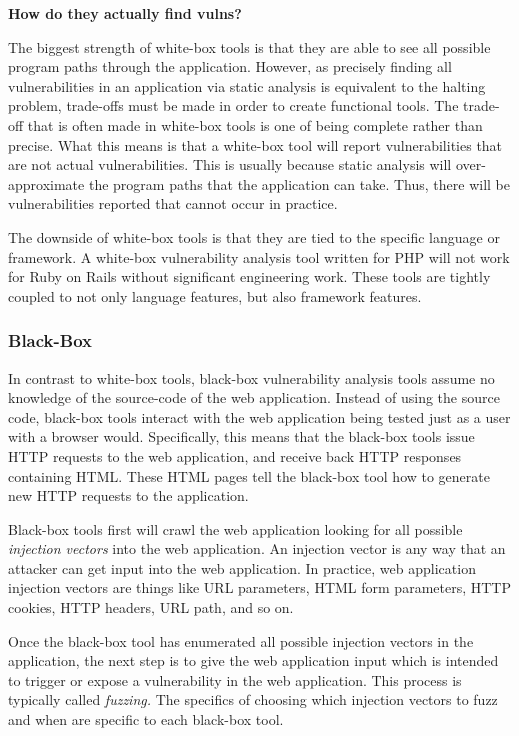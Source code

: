 \textbf{How do they actually find vulns?}

The biggest strength of white-box tools is that they are able to see
all possible program paths through the application. However, as
precisely finding all vulnerabilities in an application via static
analysis is equivalent to the halting problem, trade-offs must be made
in order to create functional tools. The trade-off that is often made
in white-box tools is one of being complete rather than precise. What
this means is that a white-box tool will report vulnerabilities that
are not actual vulnerabilities. This is usually because static
analysis will over-approximate the program paths that the application
can take. Thus, there will be vulnerabilities reported that cannot
occur in practice. 

The downside of white-box tools is that they are tied to the specific
language or framework. A white-box vulnerability analysis tool written
for PHP will not work for Ruby on Rails without significant
engineering work. These tools are tightly coupled to not only language
features, but also framework features. 

\subsubsection{Black-Box}

In contrast to white-box tools, black-box vulnerability analysis tools
assume no knowledge of the source-code of the web application. Instead
of using the source code, black-box tools interact with the web
application being tested just as a user with a browser would.
Specifically, this means that the black-box tools issue HTTP requests
to the web application, and receive back HTTP responses containing
HTML. These HTML pages tell the black-box tool how to generate new
HTTP requests to the application. 

Black-box tools first will crawl the web application looking for all
possible \emph{injection vectors} into the web application. An
injection vector is any way that an attacker can get input into the
web application. In practice, web application injection vectors are
things like URL parameters, HTML form parameters, HTTP cookies, HTTP
headers, URL path, and so on. 

Once the black-box tool has enumerated all possible injection vectors
in the application, the next step is to give the web application input
which is intended to trigger or expose a vulnerability in the web
application. This process is typically called \emph{fuzzing.} The
specifics of choosing which injection vectors to fuzz and when are
specific to each black-box tool. 

